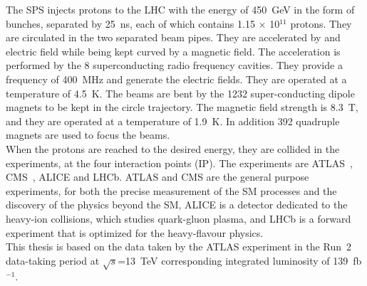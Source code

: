 The SPS injects protons to the LHC with the energy of 450~GeV in the form of bunches, separated by 25~ns, each of which contains 1.15 $\times$ 10$^{11}$ protons. They are circulated in the two separated beam pipes. They are accelerated by and electric field while being kept curved by a magnetic field. The acceleration is performed by the 8 superconducting radio frequency cavities. They provide a frequency of 400~MHz and generate the electric fields. They are operated at a temperature of 4.5~K. The beams are bent by the 1232 super-conducting dipole magnets to be kept in the circle trajectory. The magnetic field strength is 8.3~T, and they are operated at a temperature of 1.9~K. In addition 392 quadruple magnets are used to focus the beams. \\
When the protons are reached to the desired energy, they are collided in the experiments, at the four interaction points (IP). 
The experiments are ATLAS~\cite{PERF-2007-01}, CMS~\cite{CMS-TDR-08-001}, ALICE and LHCb. 
ATLAS and CMS are the general purpose experiments, for both the precise measurement of the SM processes and the discovery of the physics beyond the SM, ALICE is a detector dedicated to the heavy-ion collisions, which studies quark-gluon plasma, and LHCb is a forward experiment that is optimized for the heavy-flavour physics. \\
This thesis is based on the data taken by the ATLAS experiment in the Run~2 data-taking period at $\sqrt{s}$=13~TeV corresponding integrated luminosity of 139~fb$^{-1}$.

